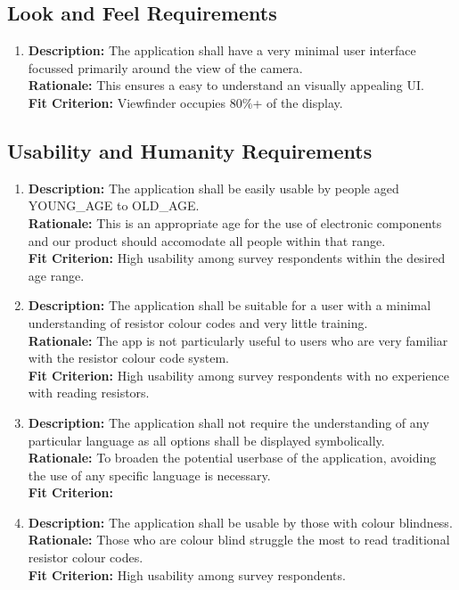 \documentclass{article}
\begin{document}
\subsection{Look and Feel Requirements }
\begin{enumerate}
\item \noindent
\textbf{Description: } The application shall have a very minimal user interface focussed primarily around the view of the camera.
\\ \textbf{Rationale: } This ensures a easy to understand an visually appealing UI.
\\ \textbf{Fit Criterion:} Viewfinder occupies 80\%+ of the display.
\end{enumerate}
\subsection{Usability and Humanity Requirements}
\begin{enumerate}
\item \textbf{Description: } The application shall be easily usable by people aged YOUNG\_AGE to OLD\_AGE. 
\\ \textbf{Rationale: } This is an appropriate age for the use of electronic components and our product should accomodate all people within that range.
\\ \textbf{Fit Criterion:} High usability among survey respondents within the desired age range.

\item \textbf{Description: } The application shall be suitable for a user with a minimal understanding of resistor colour codes and very little training.
\\ \textbf{Rationale: } The app is not particularly useful to users who are very familiar with the resistor colour code system.
\\ \textbf{Fit Criterion:} High usability among survey respondents with no experience with reading resistors.

\item \textbf{Description: } The application shall not require the understanding of any particular language as all options shall be displayed symbolically.
\\ \textbf{Rationale: } To broaden the potential userbase of the application, avoiding the use of any specific language is necessary.
\\ \textbf{Fit Criterion:} 

\item \textbf{Description: } The application shall be usable by those with colour blindness.
\\ \textbf{Rationale: } Those who are colour blind struggle the most to read traditional resistor colour codes.
\\ \textbf{Fit Criterion:} High usability among survey respondents.
\end{enumerate}
\end{document}
